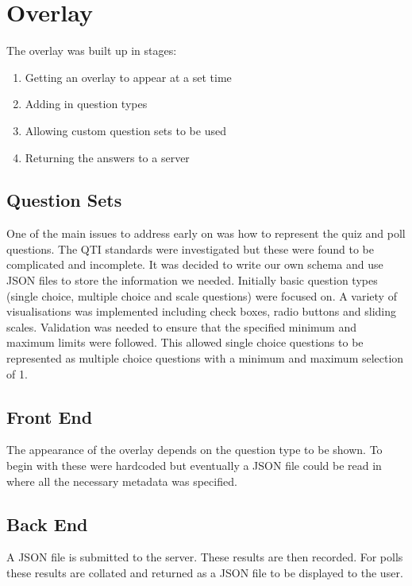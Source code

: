 \chapter{Overlay} \label{Chapter:Overlay}
The overlay was built up in stages:
\begin{enumerate}
\item Getting an overlay to appear at a set time
\item Adding in question types
\item Allowing custom question sets to be used
\item Returning the answers to a server
\end{enumerate}
\section{Question Sets} \label{Section:Question sets}
One of the main issues to address early on was how to represent the quiz and poll questions. The QTI standards were investigated but these were found to be complicated and incomplete. It was decided to write our own schema and use JSON files to store the information we needed. Initially basic question types (single choice, multiple choice and scale questions) were focused on. A variety of visualisations was implemented including check boxes, radio buttons and sliding scales. Validation was needed to ensure that the specified minimum and maximum limits were followed. This allowed single choice questions to be represented as multiple choice questions with a minimum and maximum selection of 1.
\section{Front End} \label{Section:Front end}
The appearance of the overlay depends on the question type to be shown. To begin with these were hardcoded but eventually a JSON file could be read in where all the necessary metadata was specified.
\section{Back End} \label{Section:Back end}
A JSON file is submitted to the server. These results are then recorded. For polls these results are collated and returned as a JSON file to be displayed to the user.
